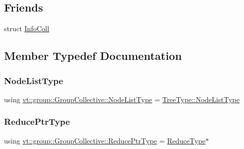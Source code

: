 \subsection*{Friends}
\begin{DoxyCompactItemize}
\item 
struct \hyperlink{structvt_1_1group_1_1_group_collective_a977ca475df628d7e164bae4a7a97c001}{Info\+Coll}
\end{DoxyCompactItemize}


\subsection{Member Typedef Documentation}
\mbox{\label{structvt_1_1group_1_1_group_collective_a24ad1fd43cf03d5026de910d85c7ac96}} 
\subsubsection{\texorpdfstring{Node\+List\+Type}{NodeListType}}
{\footnotesize\ttfamily using \hyperlink{structvt_1_1group_1_1_group_collective_a24ad1fd43cf03d5026de910d85c7ac96}{vt\+::group\+::\+Group\+Collective\+::\+Node\+List\+Type} =  \hyperlink{structvt_1_1collective_1_1tree_1_1_tree_a834e7b54ea2dceae42db7c5ea859753f}{Tree\+Type\+::\+Node\+List\+Type}}

\mbox{\label{structvt_1_1group_1_1_group_collective_a55049a9850a6110ef8ad388a6b2adafc}} 
\subsubsection{\texorpdfstring{Reduce\+Ptr\+Type}{ReducePtrType}}
{\footnotesize\ttfamily using \hyperlink{structvt_1_1group_1_1_group_collective_a55049a9850a6110ef8ad388a6b2adafc}{vt\+::group\+::\+Group\+Collective\+::\+Reduce\+Ptr\+Type} =  \hyperlink{structvt_1_1group_1_1_group_collective_acc03682a21dc3e4293720c0f6677c88d}{Reduce\+Type}$\ast$}

